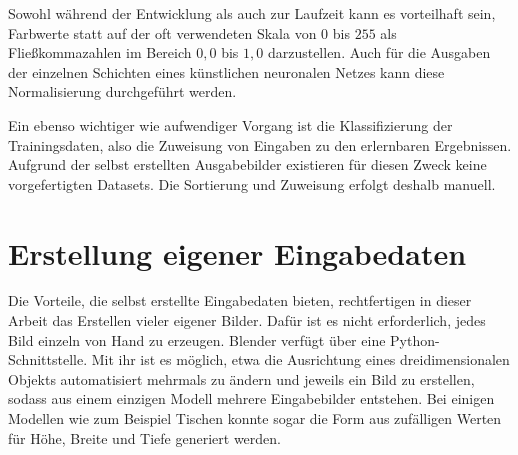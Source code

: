 Sowohl während der Entwicklung als auch zur Laufzeit kann es vorteilhaft sein, Farbwerte statt auf der oft verwendeten Skala von $0$ bis $255$ als Fließkommazahlen im Bereich $0,0$ bis $1,0$ darzustellen. Auch für die Ausgaben der einzelnen Schichten eines künstlichen neuronalen Netzes kann diese Normalisierung durchgeführt werden.

Ein ebenso wichtiger wie aufwendiger Vorgang ist die Klassifizierung der Trainingsdaten, also die Zuweisung von Eingaben zu den erlernbaren Ergebnissen. Aufgrund der selbst erstellten Ausgabebilder existieren für diesen Zweck keine vorgefertigten Datasets. Die Sortierung und Zuweisung erfolgt deshalb manuell.
\pagebreak

\section{Erstellung eigener Eingabedaten}
\label{sec:inputdata}

Die Vorteile, die selbst erstellte Eingabedaten bieten, rechtfertigen in dieser Arbeit das Erstellen vieler eigener Bilder. Dafür ist es nicht erforderlich, jedes Bild einzeln von Hand zu erzeugen. Blender verfügt über eine Python-Schnittstelle. Mit ihr ist es möglich, etwa die Ausrichtung eines dreidimensionalen Objekts automatisiert mehrmals zu ändern und jeweils ein Bild zu erstellen, sodass aus einem einzigen Modell mehrere Eingabebilder entstehen. Bei einigen Modellen wie zum Beispiel Tischen konnte sogar die Form aus zufälligen Werten für Höhe, Breite und Tiefe generiert werden.

